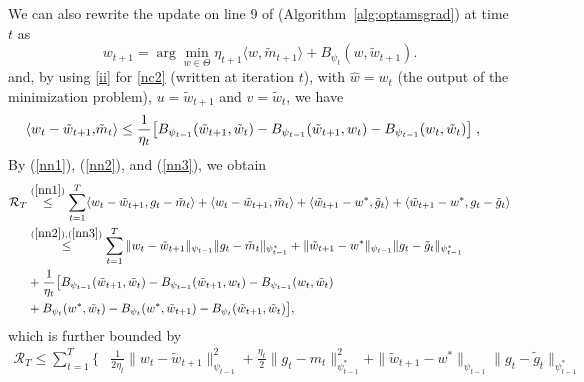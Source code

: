 \documentclass[11pt]{article}
\makeatletter
\renewenvironment{proof}[1][\proofname]{%
   \par\pushQED{\qed}\normalfont%
   \topsep6\p@\@plus6\p@\relax
   \trivlist\item[\hskip\labelsep\bfseries#1]%
   \ignorespaces
}{%
   \popQED\endtrivlist\@endpefalse
}
\theoremstyle{k}
\makeatother
\begin{document}
\begin{proof}
We can also rewrite the update on line 9 of (Algorithm~\ref{alg:optamsgrad}) at time $t$ as
\begin{equation} \label{nc2}
\textstyle w_{t+1} = \arg\min_{w \in \Theta} \eta_{t+1} \langle w, \tilde{m}_{t+1} \rangle + B_{\psi_t}(w, \tilde{w}_{t+1} ).
\end{equation}
and, by using \eqref{ii} for \eqref{nc2} (written at iteration $t$), with $\hat{w} = w_{t}$ (the output of the minimization problem), $u = \tilde{w}_{t+1}$ and $v = \tilde{w}_{t}$, we have
\begin{equation} \label{nn3}
\begin{aligned}
\langle w_t -\tilde{w}_{t+1}, & \tilde{m}_t  \rangle \leq \frac{1}{\eta_t}\big[ B_{\psi_{t-1}}(\tilde{w}_{t+1}, \tilde{w}_{t}) - B_{\psi_{t-1}}(\tilde{w}_{t+1}, w_t ) - B_{\psi_{t-1}}(w_{t}, \tilde{w}_{t}) \big] \;,
\end{aligned}
\end{equation}
By (\ref{nn1}), (\ref{nn2}), and (\ref{nn3}), we obtain
\begin{equation} \label{nnn}
\begin{aligned}
 \mathcal{R}_T & \overset{(\ref{nn1})}{\leq} \sum_{t=1}^T \langle  w_t - \tilde{w}_{t+1} , g_t - \tilde{m}_t \rangle + \langle w_t - \tilde{w}_{t+1}, \tilde{m}_t \rangle + \langle \tilde{w}_{t+1} - w^*, \tilde{g}_t  \rangle+ \langle \tilde{w}_{t+1} - w^*,g_t - \tilde{g}_t  \rangle \\
& \overset{(\ref{nn2}), (\ref{nn3})}{\leq}  \sum_{t=1}^T \| w_t - \tilde{w}_{t+1} \|_{\psi_{t-1}} \| g_t - \tilde{m}_t  \|_{\psi_{t-1}^*} + \|  \tilde{w}_{t+1} - w^* \|_{\psi_{t-1}} \| g_t - \tilde{g}_t  \|_{\psi_{t-1}^*}\\
&+ \frac{1}{\eta_t} \big[ B_{\psi_{t-1}}(\tilde{w}_{t+1}, \tilde{w}_{t}) - B_{\psi_{t-1}}(\tilde{w}_{t+1}, w_t ) - B_{\psi_{t-1}}(w_{t}, \tilde{w}_{t}) \\
& +  B_{\psi_t}( w^*, \tilde{w}_{t}) -B_{\psi_t}(w^*,  \tilde{w}_{t+1} ) - B_{\psi_t}(\tilde{w}_{t+1}, \tilde{w}_{t}) \big],
\end{aligned}
\end{equation}
which is further bounded by
\begin{equation} \label{nnnn}
\begin{aligned}
  \mathcal{R}_T \leq \sum_{t=1}^T \Big\{  & \frac{1}{2 \eta_t} \| w_t - \tilde{w}_{t+1} \|_{\psi_{t-1}}^2 + \frac{\eta_t}{2} \| g_t - m_t  \|_{\psi_{t-1}^*}^2+ \|  \tilde{w}_{t+1} - w^* \|_{\psi_{t-1}} \| g_t - \tilde{g}_t  \|_{\psi_{t-1}^*}\\\

\end{aligned}
\end{equation}
\end{proof}
\end{document}
